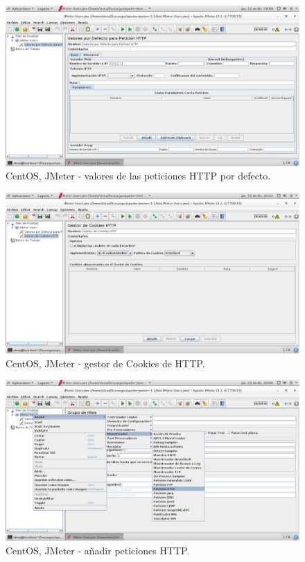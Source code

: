 \begin{figure}[H] 
	\centering
	\includegraphics[width=14.7cm]{./img/ejercicio4_5.png} 	
	\caption{CentOS, JMeter - valores de las peticiones HTTP por defecto.} \label{fig:ejercicio4_5}
\end{figure}

\begin{figure}[H] 
	\centering
	\includegraphics[width=14.7cm]{./img/ejercicio4_6.png} 	
	\caption{CentOS, JMeter - gestor de Cookies de HTTP.} \label{fig:ejercicio4_6}
\end{figure}

\begin{figure}[H] 
	\centering
	\includegraphics[width=14.7cm]{./img/ejercicio4_7.png} 	
	\caption{CentOS, JMeter - añadir peticiones HTTP.} \label{fig:ejercicio4_7}
\end{figure}

